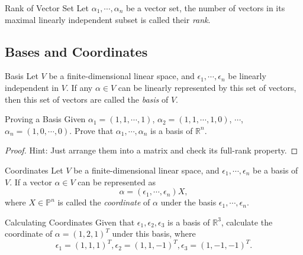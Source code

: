 \begin{definition}{Rank of Vector Set}{}
  Let $\alpha_1, \cdots, \alpha_n$ be a vector set,
  the number of vectors in its maximal linearly independent subset is called
  their \emph{rank}.
\end{definition}

\subsection{Bases and Coordinates}

\begin{definition}{Basis}{}
  Let $V$ be a finite-dimensional linear space,
  and $\epsilon_1, \cdots, \epsilon_n$ be linearly independent in $V$.
  If any $\alpha \in V$ can be linearly represented by this set of vectors,
  then this set of vectors are called the \emph{basis} of $V$.
\end{definition}

\begin{example}{Proving a Basis}{}
  Given $\alpha_1 = (1, 1, \cdots, 1)$,
  $\alpha_2 = (1, 1, \cdots, 1, 0)$,
  $\cdots$,
  $\alpha_n = (1, 0, \cdots, 0)$.
  Prove that $\alpha_1, \cdots, \alpha_n$ is a basis of $\mathbb{R}^n$.
\end{example}

\begin{proof}
  Hint: Just arrange them into a matrix and check its full-rank property.
\end{proof}

\begin{definition}{Coordinates}{}
  Let $V$ be a finite-dimensional linear space,
  and $\epsilon_1, \cdots, \epsilon_n$ be a basis of $V$.
  If a vector $\alpha \in V$ can be represented as
  \begin{equation}
    \alpha = (\epsilon_1, \cdots, \epsilon_n)X,
  \end{equation}
  where $X \in \mathbb{P}^n$ is called the \emph{coordinate} of $\alpha$
  under the basis $\epsilon_1,\cdots, \epsilon_n$.
\end{definition}

\begin{example}{Calculating Coordinates}{}
  Given that $\epsilon_{1}, \epsilon_2, \epsilon_3$ is a basis of
  $\mathbb{R}^3$,
  calculate the coordinate of $\alpha = (1, 2, 1)^T$ under this basis, where
  \begin{equation}
    \epsilon_1=(1,1,1)^T,\epsilon_2=(1,1,-1)^T,\epsilon_3=(1,-1,-1)^T.
    \end{equation}
\end{example}

